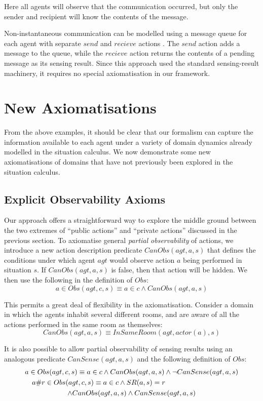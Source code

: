 Here all agents will observe that the communication occurred, but
only the sender and recipient will know the contents of the message.

Non-instantaneous communication can be modelled using a message queue
for each agent with separate $send$ and $recieve$ actions \citep{Lesperance99sitcalc_approach}.
The $send$ action adds a message to the queue, while the $recieve$
action returns the contents of a pending message as its sensing result.
Since this approach used the standard sensing-result machinery, it
requires no special axiomatisation in our framework.


\section{New Axiomatisations\label{sec:Observations:Axiomatising-extended}}

From the above examples, it should be clear that our formalism can
capture the information available to each agent under a variety of
domain dynamics already modelled in the situation calculus. We now
demonstrate some new axiomatisations of domains that have not previously
been explored in the situation calculus.


\subsection{Explicit Observability Axioms\label{sec:Observations:CanObs}}

Our approach offers a straightforward way to explore the middle ground
between the two extremes of {}``public actions'' and {}``private
actions'' discussed in the previous section. To axiomatise general
\emph{partial observability} of actions, we introduce a new action
description predicate $CanObs(agt,a,s)$ that defines the conditions
under which agent $agt$ would observe action $a$ being performed
in situation $s$. If $CanObs(agt,a,s)$ is false, then that action
will be hidden. We then use the following in the definition of $Obs$:\[
a\in Obs(agt,c,s)\equiv a\in c\wedge CanObs(agt,a,s)\]


This permits a great deal of flexibility in the axiomatisation. Consider
a domain in which the agents inhabit several different rooms, and
are aware of all the actions performed in the same room as themselves:\[
CanObs(agt,a,s)\equiv InSameRoom(agt,actor(a),s)\]


It is also possible to allow partial observability of sensing results
using an analogous predicate $CanSense(agt,a,s)$ and the following
definition of $Obs$:\begin{multline*}
a\in Obs(agt,c,s)\equiv a\in c\wedge CanObs(agt,a,s)\wedge\neg CanSense(agt,a,s)\\
\shoveleft{a\#r\in Obs(agt,c,s)\equiv a\in c\wedge SR(a,s)=r}\\
\wedge CanObs(agt,a,s)\wedge CanSense(agt,a,s)\end{multline*}


